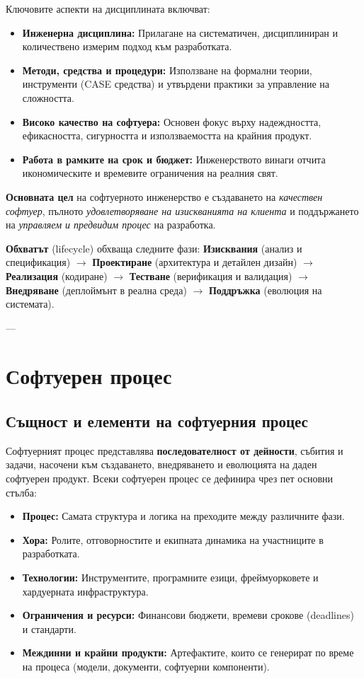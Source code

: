 \documentclass{scrartcl}
\begin{document}
\begin{FlushLeft}
Ключовите аспекти на дисциплината включват:
\begin{itemize}
    \item \textbf{Инженерна дисциплина:} Прилагане на систематичен, дисциплиниран и количествено измерим подход към разработката.
    \item \textbf{Методи, средства и процедури:} Използване на формални теории, инструменти (CASE средства) и утвърдени практики за управление на сложността.
    \item \textbf{Високо качество на софтуера:} Основен фокус върху надеждността, ефикасността, сигурността и използваемостта на крайния продукт.
    \item \textbf{Работа в рамките на срок и бюджет:} Инженерството винаги отчита икономическите и времевите ограничения на реалния свят.
\end{itemize}

\textbf{Основната цел} на софтуерното инженерство е създаването на \emph{качествен софтуер}, пълното \emph{удовлетворяване на изискванията на клиента} и поддържането на \emph{управляем и предвидим процес} на разработка.

\textbf{Обхватът} (lifecycle) обхваща следните фази: \textbf{Изисквания} (анализ и спецификация) $\rightarrow$ \textbf{Проектиране} (архитектура и детайлен дизайн) $\rightarrow$ \textbf{Реализация} (кодиране) $\rightarrow$ \textbf{Тестване} (верификация и валидация) $\rightarrow$ \textbf{Внедряване} (деплоймънт в реална среда) $\rightarrow$ \textbf{Поддръжка} (еволюция на системата).

---

\section{Софтуерен процес}

\subsection{Същност и елементи на софтуерния процес}
Софтуерният процес представлява \textbf{последователност от дейности}, събития и задачи, насочени към създаването, внедряването и еволюцията на даден софтуерен продукт. Всеки софтуерен процес се дефинира чрез пет основни стълба:
\begin{itemize}
    \item \textbf{Процес:} Самата структура и логика на преходите между различните фази.
    \item \textbf{Хора:} Ролите, отговорностите и екипната динамика на участниците в разработката.
    \item \textbf{Технологии:} Инструментите, програмните езици, фреймуорковете и хардуерната инфраструктура.
    \item \textbf{Ограничения и ресурси:} Финансови бюджети, времеви срокове (deadlines) и стандарти.
    \item \textbf{Междинни и крайни продукти:} Артефактите, които се генерират по време на процеса (модели, документи, софтуерни компоненти).
\end{itemize}


\end{FlushLeft}
\end{document}
